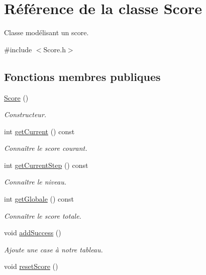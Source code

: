 \hypertarget{class_score}{\section{Référence de la classe Score}
\label{class_score}
}


Classe modélisant un score.  




{\ttfamily \#include $<$Score.\-h$>$}

\subsection*{Fonctions membres publiques}
\begin{DoxyCompactItemize}
\item 
\hyperlink{class_score_a039c99843551e5e4b512ecee99e46617}{Score} ()
\begin{DoxyCompactList}\small\item\em Constructeur. \end{DoxyCompactList}\item 
int \hyperlink{class_score_afcc13cb223fd905475a59693921451f8}{get\-Current} () const 
\begin{DoxyCompactList}\small\item\em Connaître le score courant. \end{DoxyCompactList}\item 
int \hyperlink{class_score_a68f116f8c2e0b732ee89949b0a403767}{get\-Current\-Step} () const 
\begin{DoxyCompactList}\small\item\em Connaître le niveau. \end{DoxyCompactList}\item 
int \hyperlink{class_score_a74a8797f08b2bbaa5883ec9daa4235a1}{get\-Globale} () const 
\begin{DoxyCompactList}\small\item\em Connaître le score totale. \end{DoxyCompactList}\item 
\hypertarget{class_score_a5c9ffcdf9765a29eb2ddf0d6dec622f6}{void \hyperlink{class_score_a5c9ffcdf9765a29eb2ddf0d6dec622f6}{add\-Success} ()}\label{class_score_a5c9ffcdf9765a29eb2ddf0d6dec622f6}

\begin{DoxyCompactList}\small\item\em Ajoute une case à notre tableau. \end{DoxyCompactList}\item 
\hypertarget{class_score_ade936f4b478e9b5b5188e5232b6f1a0f}{void \hyperlink{class_score_ade936f4b478e9b5b5188e5232b6f1a0f}{reset\-Score} ()}\label{class_score_ade936f4b478e9b5b5188e5232b6f1a0f}


\end{DoxyCompactItemize}
